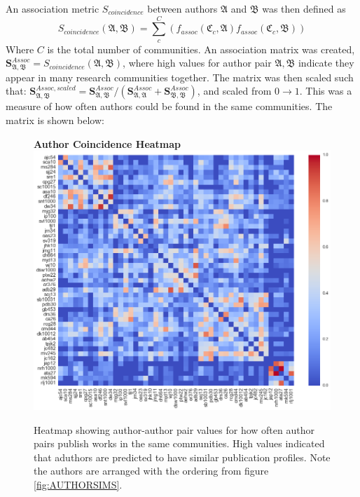 An association metric $S_{coincidence}$ between authors $\mathfrak{A}$ and $\mathfrak{B}$ was then defined as $$S_{coincidence}\left( \mathfrak{A} , \mathfrak{B} \right) = \sum_c^C \left(f_{assoc} \left( \mathfrak{C}_c , \mathfrak{A} \right) f_{assoc}\left( \mathfrak{C}_c , \mathfrak{B} \right) \right) $$
Where $C$ is the total number of communities. An association matrix was created, $\mathbf{S}^{Assoc}_{\mathfrak{A} , \mathfrak{B}} = S_{coincidence}\left( \mathfrak{A} , \mathfrak{B} \right)$, where high values for author pair $\mathfrak{A} , \mathfrak{B}$ indicate they appear in many research communities together. The matrix was then scaled such that: $\mathbf{S}^{Assoc,scaled}_{\mathfrak{A} , \mathfrak{B}} =  \mathbf{S}^{Assoc}_{\mathfrak{A} , \mathfrak{B}} /  \left( \mathbf{S}^{Assoc}_{\mathfrak{A} , \mathfrak{A}} + \mathbf{S}^{Assoc}_{\mathfrak{B} , \mathfrak{B}} \right) $, and scaled from $0 \rightarrow 1$. This was a measure of how often authors could be found in the same communities. The matrix is shown below:
\begin{center}
\begin{figure}[H]
  \centering
  \textbf{Author Coincidence Heatmap}
    \includegraphics[width=\textwidth]{Analysis/author_comm_heatmap.png}
    \caption[Author Coincidence Matrix Heatmap]{Heatmap showing author-author pair values for how often author pairs publish works in the same communities. High values indicated that aduthors are predicted to have similar publication profiles. Note the authors are arranged with the ordering from figure \ref{fig:AUTHORSIMS}.}
    \label{fig:commHEATMAP}

\end{figure} 
\end{center}
